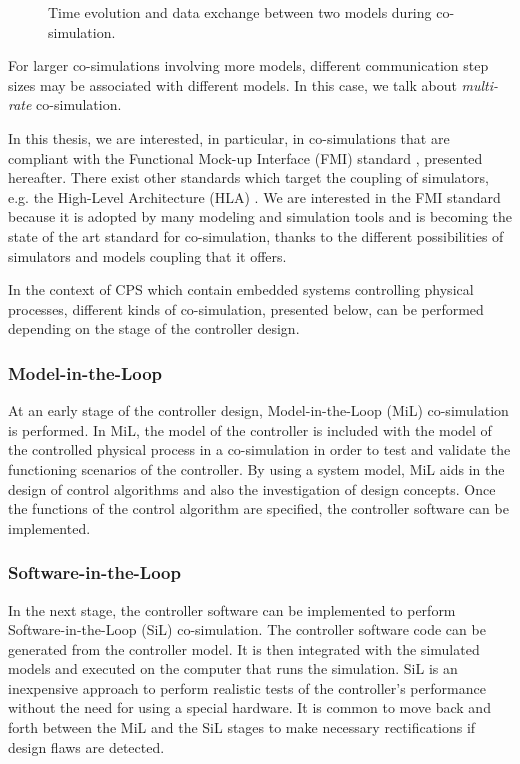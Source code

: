 \begin{figure}[phbt]
\centering

\caption{Time evolution and data exchange between two models during co-simulation.}
\label{fig:cosim}
\end{figure}

For larger co-simulations involving more models, different communication step sizes may be associated with different models. In this case, we talk about \textit{multi-rate} co-simulation.

In this thesis, we are interested, in particular, in co-simulations that are compliant with the Functional Mock-up Interface (FMI) standard \cite{fmi:2014}, presented hereafter. There exist other standards which target the coupling of simulators, e.g. the High-Level Architecture (HLA) \cite{ieee1516:2012}. We are interested in the FMI standard because it is adopted by many modeling and simulation tools and is becoming the state of the art standard for co-simulation, thanks to the different possibilities of simulators and models coupling that it offers.

In the context of CPS which contain embedded systems controlling physical processes, different kinds of co-simulation, presented below, can be performed depending on the stage of the controller design.

\subsubsection{Model-in-the-Loop}

At an early stage of the controller design, Model-in-the-Loop (MiL) co-simulation is performed. In MiL, the model of the controller is included with the model of the controlled physical process in a co-simulation in order to test and validate the functioning scenarios of the controller. By using a system model, MiL aids in the design of control algorithms and also the investigation of design concepts. Once the functions of the control algorithm are specified, the controller software can be implemented.

\subsubsection{Software-in-the-Loop}

In the next stage, the controller software can be implemented to perform Software-in-the-Loop (SiL) co-simulation. The controller software code can be generated from the controller model. It is then integrated with the simulated models and executed on the computer that runs the simulation. SiL is an inexpensive approach to perform realistic tests of the controller’s performance without the need for using a special hardware. It is common to move back and forth between the MiL and the SiL stages to make necessary rectifications if design flaws are detected.

